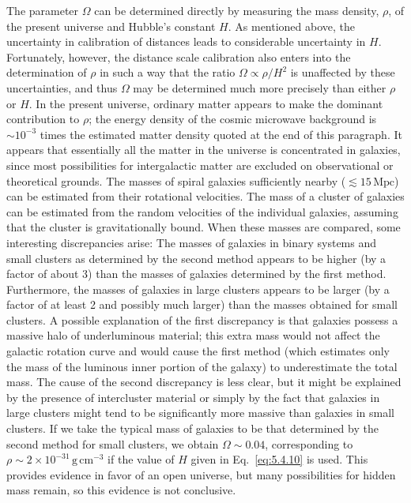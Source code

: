 The parameter \(\Omega\) can be determined directly by measuring the mass density,
\(\rho\), of the present universe and Hubble's constant \(H\). As mentioned above,
the uncertainty in calibration of distances leads to considerable uncertainty in \(H\).
Fortunately, however, the distance scale calibration also enters into the determination
of \(\rho\) in such a way that the ratio \(\Omega\propto\rho/H^2\) is unaffected by
these uncertainties, and thus \(\Omega\) may be determined much more precisely than
either \(\rho\) or \(H\). In the present universe, ordinary matter appears to make the
dominant contribution to \(\rho\); the energy density of the cosmic microwave
background is \(\sim10^{-3}\) times the estimated matter density quoted at the end of
this paragraph. It appears that essentially all the matter in the universe is concentrated
in galaxies, since most possibilities for intergalactic matter are excluded on
observational or theoretical grounds. The masses of spiral galaxies sufficiently nearby
(\(\lesssim15\,\mathrm{Mpc}\)) can be estimated from their rotational velocities. The
mass of a cluster of galaxies can be estimated from the random velocities of the
individual galaxies, assuming that the cluster is gravitationally bound. When these
masses are compared, some interesting discrepancies arise: The masses of galaxies in
binary systems and small clusters as determined by the second method appears to be
higher (by a factor of about 3) than the masses of galaxies determined by the first
method. Furthermore, the masses of galaxies in large clusters appears to be larger (by
a factor of at least 2 and possibly much larger) than the masses obtained for small
clusters. A possible explanation of the first discrepancy is that galaxies possess a
massive halo of underluminous material; this extra mass would not affect the galactic
rotation curve and would cause the first method (which estimates only the mass of the
luminous inner portion of the galaxy) to underestimate the total mass. The cause of
the second discrepancy is less clear, but it might be explained by the presence of
intercluster material or simply by the fact that galaxies in large clusters might tend to
be significantly more massive than galaxies in small clusters. If we take the typical
mass of galaxies to be that determined by the second method for small clusters, we
obtain \(\Omega\sim0.04\), corresponding to \(\rho\sim2\times10^{-31}\,
\mathrm{g\,cm^{-3}}\) if the value of \(H\) given in Eq.~\eqref{eq:5.4.10} is used.
This provides evidence in favor of an open universe, but many possibilities for hidden
mass remain, so this evidence is not conclusive.

